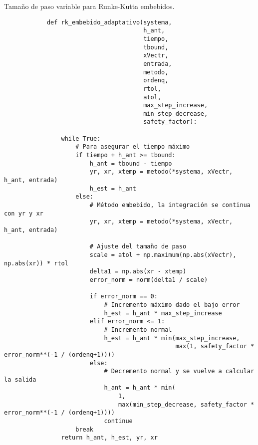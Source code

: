     \begin{longlisting}
        \caption[Tamaño de paso variable para Runke-Kutta embebidos]{Tamaño de paso variable para Runke-Kutta embebidos.}
        \label{code:embebidos}				
        \begin{verbatim}
            def rk_embebido_adaptativo(systema,
                                       h_ant,
                                       tiempo,
                                       tbound,
                                       xVectr,
                                       entrada,
                                       metodo,
                                       ordenq,
                                       rtol,
                                       atol,
                                       max_step_increase,
                                       min_step_decrease,
                                       safety_factor):
                
                while True:
                    # Para asegurar el tiempo máximo
                    if tiempo + h_ant >= tbound:
                        h_ant = tbound - tiempo
                        yr, xr, xtemp = metodo(*systema, xVectr, h_ant, entrada)
                        h_est = h_ant
                    else:
                        # Método embebido, la integración se continua con yr y xr
                        yr, xr, xtemp = metodo(*systema, xVectr, h_ant, entrada)

                        # Ajuste del tamaño de paso
                        scale = atol + np.maximum(np.abs(xVectr), np.abs(xr)) * rtol
                        delta1 = np.abs(xr - xtemp)
                        error_norm = norm(delta1 / scale)

                        if error_norm == 0:
                            # Incremento máximo dado el bajo error
                            h_est = h_ant * max_step_increase
                        elif error_norm <= 1:
                            # Incremento normal
                            h_est = h_ant * min(max_step_increase,
                                                max(1, safety_factor * error_norm**(-1 / (ordenq+1))))
                        else:
                            # Decremento normal y se vuelve a calcular la salida
                            h_ant = h_ant * min(
                                1,
                                max(min_step_decrease, safety_factor * error_norm**(-1 / (ordenq+1))))
                            continue
                    break
                return h_ant, h_est, yr, xr
        \end{verbatim}
    \end{longlisting}

